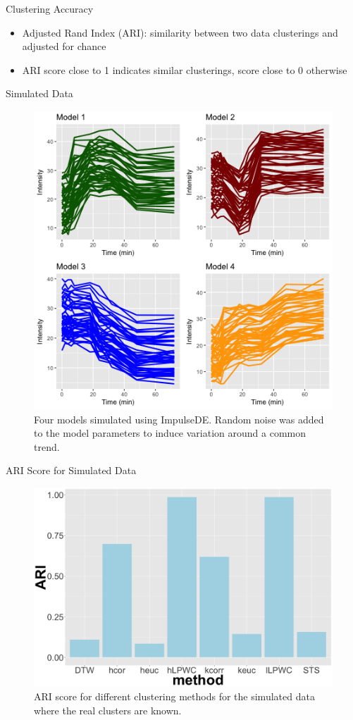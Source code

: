 \documentclass[10pt]{beamer}
\begin{document}
\begin{frame}{Clustering Accuracy}
\begin{itemize}
\item  Adjusted Rand Index (ARI): similarity between two data clusterings and adjusted for chance 
\item  ARI score close to 1 indicates similar clusterings, score close to 0 otherwise
\end{itemize}
\end{frame}


\begin{frame}{Simulated Data}
\begin{figure}
     \includegraphics[width=0.65\linewidth]{Simulation_plot.png}
      \caption{Four models simulated using ImpulseDE. Random noise was added to the model parameters to induce variation around a common trend.}
       \label{fig:simdata}
    \end{figure}
\end{frame}



\begin{frame}{ARI Score for Simulated Data}
\begin{figure}
     \includegraphics[width=0.7\linewidth]{ARI-Impulse.png}
      \caption{ARI score for different clustering methods for the simulated data where the real clusters are known.}
       \label{fig:ariscore}
    \end{figure}

\end{frame}
\end{document}
